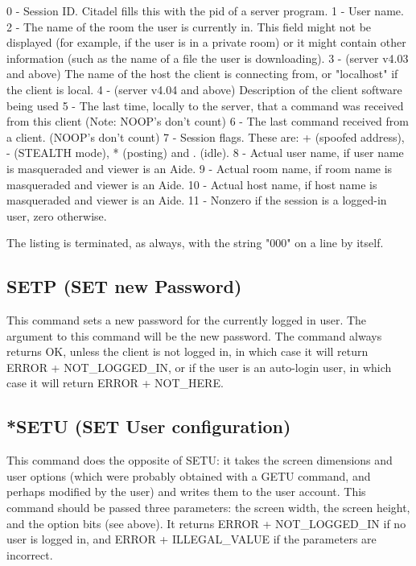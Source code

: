  0 - Session ID.  Citadel fills this with the pid of a server program.
 1 - User name.
 2 - The name of the room the user is currently in.  This field might not
be displayed (for example, if the user is in a private room) or it might
contain other information (such as the name of a file the user is
downloading).
 3 - (server v4.03 and above) The name of the host the client is connecting
from, or "localhost" if the client is local.
 4 - (server v4.04 and above) Description of the client software being used
 5 - The last time, locally to the server, that a command was received from
     this client (Note: NOOP's don't count)
 6 - The last command received from a client. (NOOP's don't count)
 7 - Session flags.  These are: + (spoofed address), - (STEALTH mode), *
     (posting) and . (idle).
 8 - Actual user name, if user name is masqueraded and viewer is an Aide.
 9 - Actual room name, if room name is masqueraded and viewer is an Aide.
 10 - Actual host name, if host name is masqueraded and viewer is an Aide.
 11 - Nonzero if the session is a logged-in user, zero otherwise.

 The listing is terminated, as always, with the string "000" on a line by
itself.



\subsection{SETP (SET new Password)}

 This command sets a new password for the currently logged in user.  The
argument to this command will be the new password.  The command always
returns OK, unless the client is not logged in, in which case it will return
ERROR + NOT_LOGGED_IN, or if the user is an auto-login user, in which case
it will return ERROR + NOT_HERE.



\subsection{*SETU (SET User configuration)}

 This command does the opposite of SETU: it takes the screen dimensions and
user options (which were probably obtained with a GETU command, and perhaps
modified by the user) and writes them to the user account.  This command
should be passed three parameters: the screen width, the screen height, and
the option bits (see above).  It returns ERROR + NOT_LOGGED_IN if no user is
logged in, and ERROR + ILLEGAL_VALUE if the parameters are incorrect.

